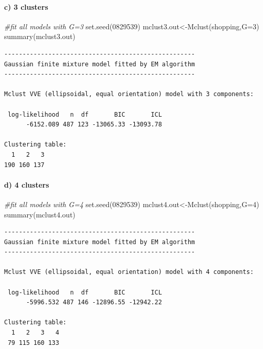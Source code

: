 \documentclass[
  11pt,
]{article}
\newenvironment{Shaded}{\begin{snugshade}}{\end{snugshade}}
\newcommand{\AttributeTok}[1]{\textcolor[rgb]{0.77,0.63,0.00}{#1}}
\newcommand{\CommentTok}[1]{\textcolor[rgb]{0.56,0.35,0.01}{\textit{#1}}}
\newcommand{\DecValTok}[1]{\textcolor[rgb]{0.00,0.00,0.81}{#1}}
\newcommand{\FunctionTok}[1]{\textcolor[rgb]{0.00,0.00,0.00}{#1}}
\newcommand{\NormalTok}[1]{#1}
\newcommand{\OtherTok}[1]{\textcolor[rgb]{0.56,0.35,0.01}{#1}}
\begin{document}
\hypertarget{c-3-clusters-1}{%
\paragraph{c) 3 clusters}\label{c-3-clusters-1}}

\begin{Shaded}
\begin{Highlighting}[]
\CommentTok{\#fit all models with G=3}
\FunctionTok{set.seed}\NormalTok{(}\DecValTok{0829539}\NormalTok{)}
\NormalTok{mclust3.out}\OtherTok{\textless{}{-}}\FunctionTok{Mclust}\NormalTok{(shopping,}\AttributeTok{G=}\DecValTok{3}\NormalTok{)}
\FunctionTok{summary}\NormalTok{(mclust3.out)}
\end{Highlighting}
\end{Shaded}

\begin{verbatim}
---------------------------------------------------- 
Gaussian finite mixture model fitted by EM algorithm 
---------------------------------------------------- 

Mclust VVE (ellipsoidal, equal orientation) model with 3 components: 

 log-likelihood   n  df       BIC       ICL
      -6152.089 487 123 -13065.33 -13093.78

Clustering table:
  1   2   3 
190 160 137 
\end{verbatim}

\hypertarget{d-4-clusters-1}{%
\paragraph{d) 4 clusters}\label{d-4-clusters-1}}

\begin{Shaded}
\begin{Highlighting}[]
\CommentTok{\#fit all models with G=4}
\FunctionTok{set.seed}\NormalTok{(}\DecValTok{0829539}\NormalTok{)}
\NormalTok{mclust4.out}\OtherTok{\textless{}{-}}\FunctionTok{Mclust}\NormalTok{(shopping,}\AttributeTok{G=}\DecValTok{4}\NormalTok{)}
\FunctionTok{summary}\NormalTok{(mclust4.out)}
\end{Highlighting}
\end{Shaded}

\begin{verbatim}
---------------------------------------------------- 
Gaussian finite mixture model fitted by EM algorithm 
---------------------------------------------------- 

Mclust VVE (ellipsoidal, equal orientation) model with 4 components: 

 log-likelihood   n  df       BIC       ICL
      -5996.532 487 146 -12896.55 -12942.22

Clustering table:
  1   2   3   4 
 79 115 160 133 
\end{verbatim}
\end{document}
